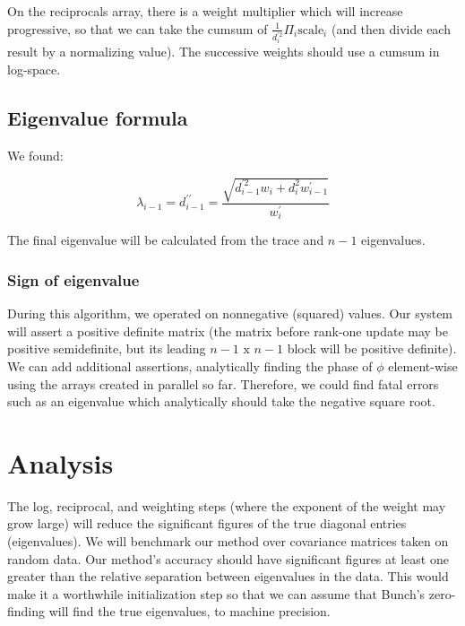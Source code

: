 \documentclass{article}
\begin{document}
On the reciprocals array, there is a weight multiplier which will increase progressive, so that we can take the cumsum of $\frac{1}{d_i^{\prime2}} \Pi_i \text{scale}_i$ (and then divide each result by a normalizing value). The successive weights should use a cumsum in log-space.

\subsection*{Eigenvalue formula}

We found:

$$\lambda_{i-1} = d_{i-1}^{\prime\prime} = \frac{\sqrt{d_{i-1}^{\prime2} w_i + d_i^2 w_{i-1}^\prime}}{w_i^\prime}$$

The final eigenvalue will be calculated from the trace and $n-1$ eigenvalues.

\subsubsection*{Sign of eigenvalue}

During this algorithm, we operated on nonnegative (squared) values. Our system will assert a positive definite matrix (the matrix before rank-one update may be positive semidefinite, but its leading $n-1\text{ x }n-1$ block will be positive definite). We can add additional assertions, analytically finding the phase of $\phi$ element-wise using the arrays created in parallel so far. Therefore, we could find fatal errors such as an eigenvalue which analytically should take the negative square root.

\section{Analysis}

The log, reciprocal, and weighting steps (where the exponent of the weight may grow large) will reduce the significant figures of the true diagonal entries (eigenvalues). We will benchmark our method over covariance matrices taken on random data. Our method's accuracy should have significant figures at least one greater than the relative separation between eigenvalues in the data. This would make it a worthwhile initialization step so that we can assume that Bunch's zero-finding will find the true eigenvalues, to machine precision.
\end{document}
